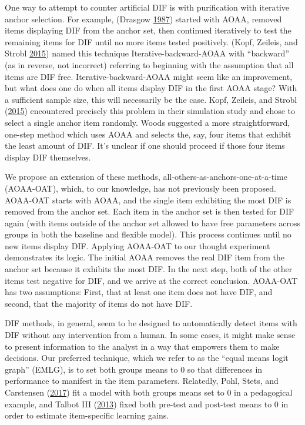 \documentclass[
  11pt,
]{article}
\begin{document}
One way to attempt to counter artificial DIF is with purification with iterative anchor selection. For example, (Drasgow \protect\hyperlink{ref-drasgow1987study}{1987}) started with AOAA, removed items displaying DIF from the anchor set, then continued iteratively to test the remaining items for DIF until no more items tested positively. (Kopf, Zeileis, and Strobl \protect\hyperlink{ref-kopf2015framework}{2015}) named this technique Iterative-backward-AOAA with \enquote{backward} (as in reverse, not incorrect) referring to beginning with the assumption that all items are DIF free. Iterative-backward-AOAA might seem like an improvement, but what does one do when all items display DIF in the first AOAA stage? With a sufficient sample size, this will necessarily be the case. Kopf, Zeileis, and Strobl (\protect\hyperlink{ref-kopf2015framework}{2015}) encountered precisely this problem in their simulation study and chose to select a single anchor item randomly. Woods suggested a more straightforward, one-step method which uses AOAA and selects the, say, four items that exhibit the least amount of DIF. It's unclear if one should proceed if those four items display DIF themselves.

We propose an extension of these methods, all-others-as-anchors-one-at-a-time (AOAA-OAT), which, to our knowledge, has not previously been proposed. AOAA-OAT starts with AOAA, and the single item exhibiting the most DIF is removed from the anchor set. Each item in the anchor set is then tested for DIF again (with items outside of the anchor set allowed to have free parameters across groups in both the baseline and flexible model). This process continues until no new items display DIF. Applying AOAA-OAT to our thought experiment demonstrates its logic. The initial AOAA removes the real DIF item from the anchor set because it exhibits the most DIF. In the next step, both of the other items test negative for DIF, and we arrive at the correct conclusion. AOAA-OAT has two assumptions: First, that at least one item does not have DIF, and second, that the majority of items do not have DIF.

DIF methods, in general, seem to be designed to automatically detect items with DIF without any intervention from a human. In some cases, it might make sense to present information to the analyst in a way that empowers them to make decisions. Our preferred technique, which we refer to as the \enquote{equal means logit graph} (EMLG), is to set both groups means to 0 so that differences in performance to manifest in the item parameters. Relatedly, Pohl, Stets, and Carstensen (\protect\hyperlink{ref-pohl2017cluster}{2017}) fit a model with both groups means set to 0 in a pedagogical example, and Talbot III (\protect\hyperlink{ref-talbot2013taking}{2013}) fixed both pre-test and post-test means to 0 in order to estimate item-specific learning gains.
\end{document}
